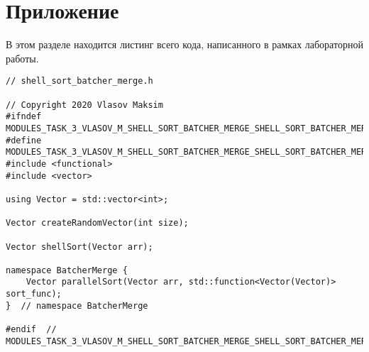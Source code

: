 \documentclass{report}
\begin{document}
\section*{Приложение}
В этом разделе находится листинг всего кода, написанного в рамках лабораторной работы.
\begin{lstlisting}
// shell_sort_batcher_merge.h

// Copyright 2020 Vlasov Maksim
#ifndef MODULES_TASK_3_VLASOV_M_SHELL_SORT_BATCHER_MERGE_SHELL_SORT_BATCHER_MERGE_H_
#define MODULES_TASK_3_VLASOV_M_SHELL_SORT_BATCHER_MERGE_SHELL_SORT_BATCHER_MERGE_H_
#include <functional>
#include <vector>

using Vector = std::vector<int>;

Vector createRandomVector(int size);

Vector shellSort(Vector arr);

namespace BatcherMerge {
    Vector parallelSort(Vector arr, std::function<Vector(Vector)> sort_func);
}  // namespace BatcherMerge

#endif  // MODULES_TASK_3_VLASOV_M_SHELL_SORT_BATCHER_MERGE_SHELL_SORT_BATCHER_MERGE_H_
\end{lstlisting}
\end{document}
